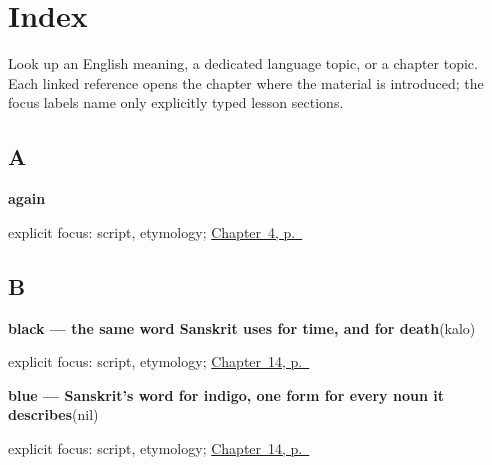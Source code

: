 
\chapter*{Index}

Look up an English meaning, a dedicated language topic, or a chapter topic. Each linked reference opens the chapter where the material is introduced; the focus labels name only explicitly typed lesson sections.

\section*{A}

\noindent\begin{minipage}[t]{\linewidth}
\raggedright
\textbf{again}\enspace\emph{}\par
\footnotesize explicit focus: script, etymology; \hyperref[ch:farewells]{Chapter~4, p.~\pageref*{ch:farewells}}
\end{minipage}\par\smallskip

\section*{B}

\noindent\begin{minipage}[t]{\linewidth}
\raggedright
\textbf{black — the same word Sanskrit uses for time, and for death}\enspace\emph{}\enspace(kalo)\par
\footnotesize explicit focus: script, etymology; \hyperref[ch:bn-five-colors]{Chapter~14, p.~\pageref*{ch:bn-five-colors}}
\end{minipage}\par\smallskip

\noindent\begin{minipage}[t]{\linewidth}
\raggedright
\textbf{blue — Sanskrit's word for indigo, one form for every noun it describes}\enspace\emph{}\enspace(nil)\par
\footnotesize explicit focus: script, etymology; \hyperref[ch:bn-five-colors]{Chapter~14, p.~\pageref*{ch:bn-five-colors}}
\end{minipage}\par\smallskip

